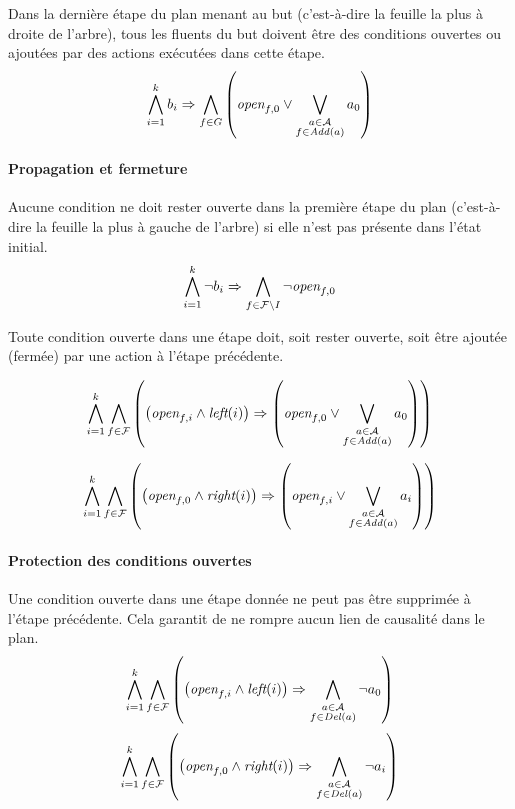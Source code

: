 Dans la dernière étape du plan menant au but (c'est-à-dire la feuille la plus à droite de l'arbre), tous les fluents du but doivent être des conditions ouvertes ou ajoutées par des actions exécutées dans cette étape.
\[ \bigwedge\limits_{\substack{i=1}}^{k}b_{i} \Rightarrow \bigwedge\limits_{\substack{f\in G}} \left(\textit{open}_{f,0} \vee \bigvee\limits_{\substack{a \in \mathcal{A} \\ f \in \mathit{Add}(a)}} a_{0}\right) \]

\paragraph*{Propagation et fermeture}

Aucune condition ne doit rester ouverte dans la première étape du plan (c'est-à-dire la feuille la plus à gauche de l'arbre) si elle n'est pas présente dans l'état initial.
\[ \bigwedge\limits_{\substack{i=1}}^{k}\neg b_{i} \Rightarrow \bigwedge\limits_{\substack{f\in \mathcal{F}\setminus I}} \neg \textit{open}_{f,0} \]	

Toute condition ouverte dans une étape doit, soit rester ouverte, soit être ajoutée (fermée) par une action à l'étape précédente.

\[ \bigwedge\limits_{\substack{i=1}}^{k} \bigwedge\limits_{\substack{f\in \mathcal{F}}} \left(\left(\textit{open}_{f,i} \wedge \textit{left}(i) \right) \Rightarrow \left(\textit{open}_{f,0} \vee \bigvee\limits_{\substack{a \in \mathcal{A} \\ f \in \mathit{Add}(a)}} a_{0}\right)\right) \]

\[ \bigwedge\limits_{\substack{i=1}}^{k}\bigwedge\limits_{\substack{f\in \mathcal{F}}}\left(\left(\textit{open}_{f,0} \wedge \textit{right}(i) \right) \Rightarrow \left(\textit{open}_{f,i} \vee \bigvee\limits_{\substack{a \in \mathcal{A} \\ f \in \mathit{Add}(a)}} a_{i}\right)\right)
\]

 \paragraph*{Protection des conditions ouvertes}

Une condition ouverte dans une étape donnée ne peut pas être supprimée à l'étape précédente. Cela garantit de ne rompre aucun lien de causalité dans le plan.
\[ \bigwedge\limits_{\substack{i=1}}^{k} \bigwedge\limits_{\substack{f\in \mathcal{F}}}\left(\left(\textit{open}_{f,i} \wedge \textit{left}(i) \right) \Rightarrow \bigwedge\limits_{\substack{a \in \mathcal{A}\\ f \in \mathit{Del}(a)}}\neg a_{0}\right) \]
\[ \bigwedge\limits_{\substack{i=1}}^{k} \bigwedge\limits_{\substack{f \in \mathcal{F}}} \left(\left(\textit{open}_{f,0} \wedge \textit{right}(i) \right) \Rightarrow \bigwedge\limits_{\substack{a \in \mathcal{A} \\ f \in \mathit{Del}(a)}}\neg a_{i}\right) \]

